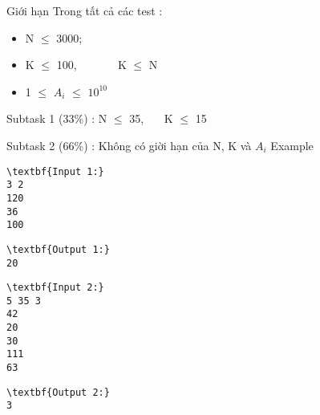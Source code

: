 Giới hạn
Trong tất cả các test :
\begin{itemize}
	\item N  $\le$  3000;
	\item K  $\le$  100,        K  $\le$  N
	\item 1  $\le$  $A_{i}$  $\le$  $10^{10}$
\end{itemize}

Subtask 1 (33\%) : N  $\le$  35,    K  $\le$  15

Subtask 2 (66\%) : Không có giời hạn của N, K và $A_{i}$
Example
\begin{verbatim}
\textbf{Input 1:}
3 2
120
36
100\end{verbatim}
\begin{verbatim}
\textbf{Output 1:}
20\end{verbatim}
\begin{verbatim}
\textbf{Input 2:}
5 35 3
42
20
30
111
63\end{verbatim}
\begin{verbatim}
\textbf{Output 2:}
3
\end{verbatim}
